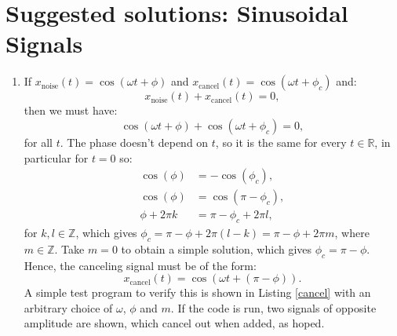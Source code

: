 
\newpage
\section{Suggested solutions: Sinusoidal Signals}
\begin{enumerate}
  \item If $x_{\text{noise}}(t)=\cos(\omega t+\phi)$ and $x_{\text{cancel}}(t)=\cos(\omega t+\phi_{c})$ and:
        \[ x_{\text{noise}}(t)+x_{\text{cancel}}(t)=0, \]
        then we must have:
        \[ \cos(\omega t+\phi)+\cos(\omega t+\phi_{c})=0, \]
        for all $t$. The phase doesn't depend on $t$, so it is the same for every $t\in\mathbb{R}$, in particular for $t=0$ so:
        \begin{align*}
          \cos(\phi)  & =-\cos(\phi_{c}),     \\
          \cos(\phi)  & =\cos(\pi -\phi_{c}), \\
          \phi+2\pi k & =\pi-\phi_{c}+2\pi l,
        \end{align*}
        for $k,l\in\mathbb{Z}$, which gives $\phi_{c}=\pi-\phi+2\pi(l-k)=\pi-\phi+2\pi m$,
        where $m\in\mathbb{Z}$. Take $m=0$ to obtain a simple solution, which gives $\phi_{c}=\pi -\phi$.
        Hence, the canceling signal must be of the form:
        \[ x_{\text{cancel}}(t)=\cos(\omega t+(\pi-\phi)). \]
        A simple test program to verify this is shown in Listing \ref{cancel}
        with an arbitrary choice of $\omega$, $\phi$ and $m$.
        If the code is run, two signals of opposite amplitude are shown,
        which cancel out when added, as hoped.
        


\end{enumerate}
